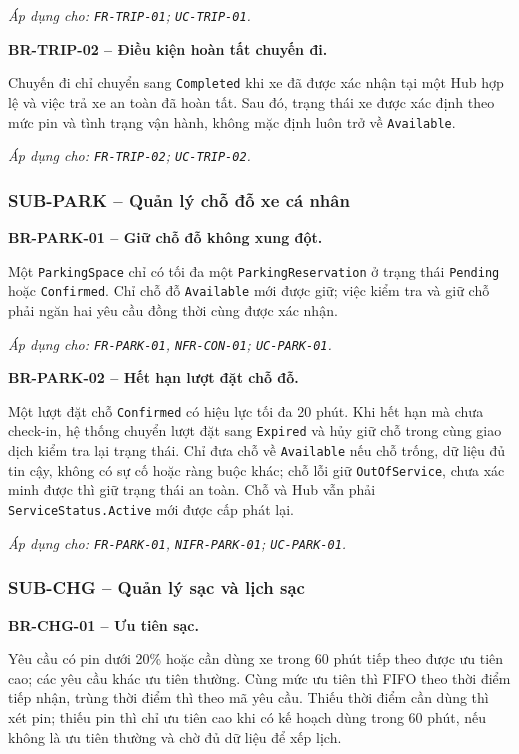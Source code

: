 \textit{Áp dụng cho: \texttt{FR-TRIP-01}; \texttt{UC-TRIP-01}.}

\medskip
\noindent\textbf{BR-TRIP-02 -- Điều kiện hoàn tất chuyến đi.}\par
\nopagebreak[4]
Chuyến đi chỉ chuyển sang \texttt{Completed} khi xe đã được xác nhận tại một Hub hợp lệ và việc trả xe an toàn đã hoàn tất. Sau đó, trạng thái xe được xác định theo mức pin và tình trạng vận hành, không mặc định luôn trở về \texttt{Available}.

\textit{Áp dụng cho: \texttt{FR-TRIP-02}; \texttt{UC-TRIP-02}.}

\subsubsection{SUB-PARK -- Quản lý chỗ đỗ xe cá nhân}

\noindent\textbf{BR-PARK-01 -- Giữ chỗ đỗ không xung đột.}\par
\nopagebreak[4]
Một \texttt{ParkingSpace} chỉ có tối đa một \texttt{ParkingReservation} ở trạng thái \texttt{Pending} hoặc \texttt{Confirmed}. Chỉ chỗ đỗ \texttt{Available} mới được giữ; việc kiểm tra và giữ chỗ phải ngăn hai yêu cầu đồng thời cùng được xác nhận.

\textit{Áp dụng cho: \texttt{FR-PARK-01}, \texttt{NFR-CON-01}; \texttt{UC-PARK-01}.}

\medskip
\noindent\textbf{BR-PARK-02 -- Hết hạn lượt đặt chỗ đỗ.}\par
\nopagebreak[4]
Một lượt đặt chỗ \texttt{Confirmed} có hiệu lực tối đa 20 phút. Khi hết hạn mà chưa check-in, hệ thống chuyển lượt đặt sang \texttt{Expired} và hủy giữ chỗ trong cùng giao dịch kiểm tra lại trạng thái. Chỉ đưa chỗ về \texttt{Available} nếu chỗ trống, dữ liệu đủ tin cậy, không có sự cố hoặc ràng buộc khác; chỗ lỗi giữ \texttt{OutOfService}, chưa xác minh được thì giữ trạng thái an toàn. Chỗ và Hub vẫn phải \texttt{ServiceStatus.Active} mới được cấp phát lại.

\textit{Áp dụng cho: \texttt{FR-PARK-01}, \texttt{NIFR-PARK-01}; \texttt{UC-PARK-01}.}

\subsubsection{SUB-CHG -- Quản lý sạc và lịch sạc}

\noindent\textbf{BR-CHG-01 -- Ưu tiên sạc.}\par
\nopagebreak[4]
Yêu cầu có pin dưới 20\% hoặc cần dùng xe trong 60 phút tiếp theo được ưu tiên cao; các yêu cầu khác ưu tiên thường. Cùng mức ưu tiên thì FIFO theo thời điểm tiếp nhận, trùng thời điểm thì theo mã yêu cầu. Thiếu thời điểm cần dùng thì xét pin; thiếu pin thì chỉ ưu tiên cao khi có kế hoạch dùng trong 60 phút, nếu không là ưu tiên thường và chờ đủ dữ liệu để xếp lịch.

